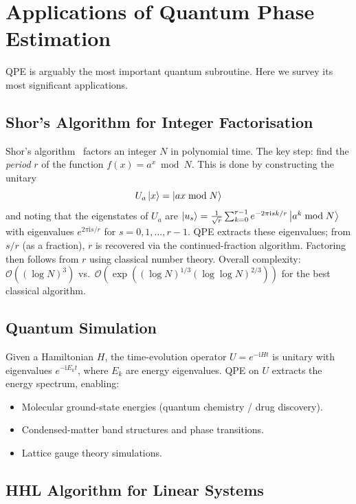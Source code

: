 \documentclass[12pt,a4paper]{article}
\newcommand{\QPE}{\textsc{QPE}}
\newcommand{\ii}{\mathrm{i}}
\newcommand{\bigO}{\mathcal{O}}
\begin{document}
\section{Applications of Quantum Phase Estimation}
\label{sec:applications}

\QPE{} is arguably the most important quantum subroutine.  Here we survey
its most significant applications.

\subsection{Shor's Algorithm for Integer Factorisation}

Shor's algorithm~\cite{shor1994} factors an integer $N$ in polynomial time.
The key step: find the \emph{period} $r$ of the function $f(x) = a^x \bmod N$.
This is done by constructing the unitary
\[
  U_a\Ket{x} = \Ket{ax \bmod N}
\]
and noting that the eigenstates of $U_a$ are
$\Ket{u_s} = \frac{1}{\sqrt{r}}\sum_{k=0}^{r-1}e^{-2\pi\ii sk/r}\Ket{a^k\bmod N}$
with eigenvalues $e^{2\pi\ii s/r}$ for $s = 0, 1, \ldots, r-1$.
\QPE{} extracts these eigenvalues; from $s/r$ (as a fraction), $r$ is
recovered via the continued-fraction algorithm.  Factoring then follows from
$r$ using classical number theory.  Overall complexity:
$\bigO((\log N)^3)$ vs.\ $\bigO\!\left(\exp((\log N)^{1/3}(\log\log N)^{2/3})\right)$
for the best classical algorithm.

\subsection{Quantum Simulation}

Given a Hamiltonian $H$, the time-evolution operator $U = e^{-\ii Ht}$ is
unitary with eigenvalues $e^{-\ii E_k t}$, where $E_k$ are energy eigenvalues.
\QPE{} on $U$ extracts the energy spectrum, enabling:
\begin{itemize}[leftmargin=*]
  \item Molecular ground-state energies (quantum chemistry / drug discovery).
  \item Condensed-matter band structures and phase transitions.
  \item Lattice gauge theory simulations.
\end{itemize}

\subsection{HHL Algorithm for Linear Systems}
\end{document}
